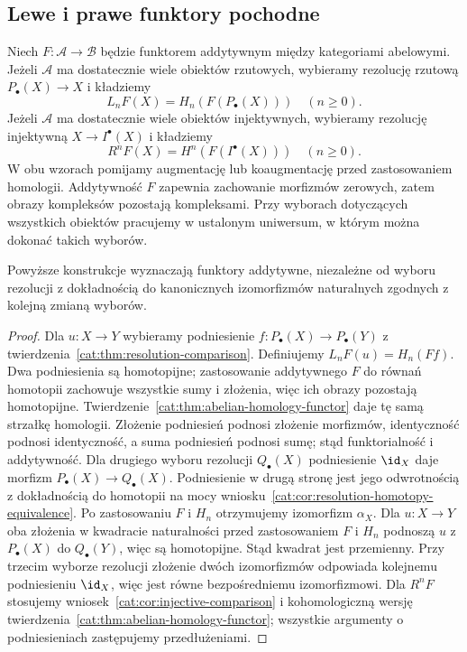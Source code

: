 \subsection{Lewe i prawe funktory pochodne}
\begin{definicja}\label{cat:def:derived-functors}
Niech $F:\mathcal A\to\mathcal B$ będzie funktorem addytywnym między kategoriami abelowymi. Jeżeli $\mathcal A$ ma dostatecznie wiele obiektów rzutowych, wybieramy rezolucję rzutową $P_\bullet(X)\to X$ i kładziemy
\[
 L_nF(X)=H_n(F(P_\bullet(X)))\quad(n\ge0).
\]
Jeżeli $\mathcal A$ ma dostatecznie wiele obiektów injektywnych, wybieramy rezolucję injektywną $X\to I^\bullet(X)$ i kładziemy
\[
 R^nF(X)=H^n(F(I^\bullet(X)))\quad(n\ge0).
\]
W obu wzorach pomijamy augmentację lub koaugmentację przed zastosowaniem homologii. Addytywność $F$ zapewnia zachowanie morfizmów zerowych, zatem obrazy kompleksów pozostają kompleksami. Przy wyborach dotyczących wszystkich obiektów pracujemy w ustalonym uniwersum, w którym można dokonać takich wyborów.
\end{definicja}
\begin{twierdzenie}\label{cat:thm:derived-well-defined}
Powyższe konstrukcje wyznaczają funktory addytywne, niezależne od wyboru rezolucji z dokładnością do kanonicznych izomorfizmów naturalnych zgodnych z kolejną zmianą wyborów.
\end{twierdzenie}
\begin{proof}
Dla $u:X\to Y$ wybieramy podniesienie $f:P_\bullet(X)\to P_\bullet(Y)$ z twierdzenia~\ref{cat:thm:resolution-comparison}. Definiujemy $L_nF(u)=H_n(Ff)$. Dwa podniesienia są homotopijne; zastosowanie addytywnego $F$ do równań homotopii zachowuje wszystkie sumy i złożenia, więc ich obrazy pozostają homotopijne. Twierdzenie~\ref{cat:thm:abelian-homology-functor} daje tę samą strzałkę homologii. Złożenie podniesień podnosi złożenie morfizmów, identyczność podnosi identyczność, a suma podniesień podnosi sumę; stąd funktorialność i addytywność.
Dla drugiego wyboru rezolucji $Q_\bullet(X)$ podniesienie $\id_X$ daje morfizm $P_\bullet(X)\to Q_\bullet(X)$. Podniesienie w drugą stronę jest jego odwrotnością z dokładnością do homotopii na mocy wniosku~\ref{cat:cor:resolution-homotopy-equivalence}. Po zastosowaniu $F$ i $H_n$ otrzymujemy izomorfizm $\alpha_X$. Dla $u:X\to Y$ oba złożenia w kwadracie naturalności przed zastosowaniem $F$ i $H_n$ podnoszą $u$ z $P_\bullet(X)$ do $Q_\bullet(Y)$, więc są homotopijne. Stąd kwadrat jest przemienny. Przy trzecim wyborze rezolucji złożenie dwóch izomorfizmów odpowiada kolejnemu podniesieniu $\id_X$, więc jest równe bezpośredniemu izomorfizmowi. Dla $R^nF$ stosujemy wniosek~\ref{cat:cor:injective-comparison} i kohomologiczną wersję twierdzenia~\ref{cat:thm:abelian-homology-functor}; wszystkie argumenty o podniesieniach zastępujemy przedłużeniami.
\end{proof}
